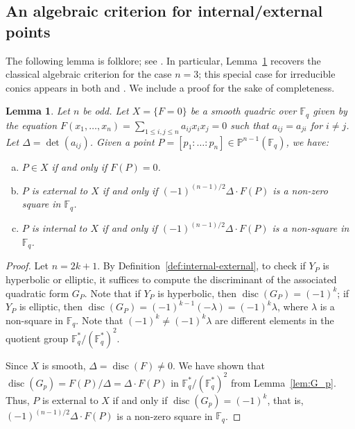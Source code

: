 \documentclass[12pt,reqno]{amsart}
\newtheorem{lem}[thm]{Lemma}
\theoremstyle{definition}
\newcommand{\F}{\mathbb{F}}
\newcommand{\disc}{\operatorname{disc}}
\begin{document}
\subsection{An algebraic criterion for internal/external points}

The following lemma is folklore; see \cite[Proof of Proposition 6.1]{BIK23}. In particular, Lemma~\ref{lem:discriminant} recovers the classical algebraic criterion for the case $n=3$; this special case for irreducible conics appears in both \cite[Theorem 8.3.3]{H79} and \cite[Result 1]{S92}. We include a proof for the sake of completeness. 

\begin{lem}\label{lem:discriminant}
Let $n$ be odd. Let $X=\{F=0\}$ be a smooth quadric over $\F_q$ given by the equation $F(x_1, \ldots, x_{n}) = \sum_{1\leq i, j \leq n} a_{ij} x_i x_j =0$ such that $a_{ij}=a_{ji}$ for $i\neq j$. Let $\Delta=\det(a_{ij})$. Given a point $P=[p_1: \ldots: p_{n}] \in \mathbb{P}^{n-1}(\F_q)$, we have:
\begin{enumerate}[(a)]
    \item $P\in X$ if and only if $F(P) = 0$.
    \item $P$ is external to $X$ if and only if $(-1)^{(n-1)/2}\Delta\cdot F(P)$ is a non-zero square in $\F_q$.
    \item $P$ is internal to $X$ if and only if $(-1)^{(n-1)/2}\Delta\cdot F(P)$ is a non-square in $\F_q$.
\end{enumerate}    
\end{lem}
\begin{proof}
Let $n=2k+1$. By Definition~\ref{def:internal-external}, to check if $Y_P$ is hyperbolic or elliptic, it suffices to compute the discriminant of the associated quadratic form $G_P$. Note that if $Y_P$ is hyperbolic, then $\disc(G_P)=(-1)^k$; if $Y_P$ is elliptic, then $\disc(G_P)=(-1)^{k-1} (-\lambda)=(-1)^k \lambda$, where $\lambda$ is a non-square in $\F_q$. Note that $(-1)^k \neq (-1)^k \lambda$ are different elements in the quotient group $\F^{\ast}_{q}/(\F^{\ast}_q)^2$. 

Since $X$ is smooth, $\Delta=\disc(F) \neq 0$. We have shown that $\disc(G_p)=F(P)/\Delta=\Delta \cdot F(P)$ in $\F^{\ast}_{q}/(\F^{\ast}_q)^2$ from Lemma~\ref{lem:G_p}. Thus, $P$ is external to $X$ if and only if $\disc(G_p)=(-1)^k$, that is, $(-1)^{(n-1)/2}\Delta\cdot F(P)$ is a non-zero square in $\F_q$.
\end{proof}
\end{document}
